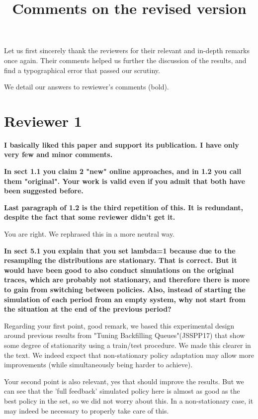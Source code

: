 \documentclass[]{article}
\title{Comments on the revised version}
\begin{document}
\maketitle

Let us first sincerely thank the reviewers for their relevant and in-depth
remarks once again. Their comments helped us further the discussion of the
results, and find a typographical error that passed our scrutiny.

We detail our answers to rewiewer's comments (bold).

\section{Reviewer 1}

\textbf{
  I basically liked this paper and support its publication.  I have only very few and minor comments.}

\textbf{In sect 1.1 you claim 2 "new" online approaches, and in 1.2 you call them "original". Your work is valid even if you
admit that both have been suggested before.
}

\textbf{Last paragraph of 1.2 is the third repetition of this.  It is redundant, despite the fact that some reviewer didn't get
it.
}

You are right. We rephrased this in a more neutral way.

\textbf{In sect 5.1 you explain that you set lambda=1 because due to the resampling the distributions are stationary.  That is
correct.  But it would have been good to also conduct simulations on the original traces, which are probably not
stationary, and therefore there is more to gain from switching between policies.
Also, instead of starting the simulation of each period from an empty system, why not start from the situation at the
end of the previous period?
}

Regarding your first point, good remark, we based this experimental design
around previous results from "Tuning Backfilling Queues"(JSSPP17) that show
some degree of stationarity using a train/test procedure. We made this clearer
in the text.
We indeed expect that non-stationary policy adaptation may allow more
improvements (while simultaneously being harder to achieve).

Your second point is also relevant, yes that should improve the results.
But we can see that the 'full feedback' simulated policy here is almost as good as the best
policy in the set, so we did not worry about this. In a non-stationary case, it may indeed
be necessary to properly take care of this.
\end{document}
